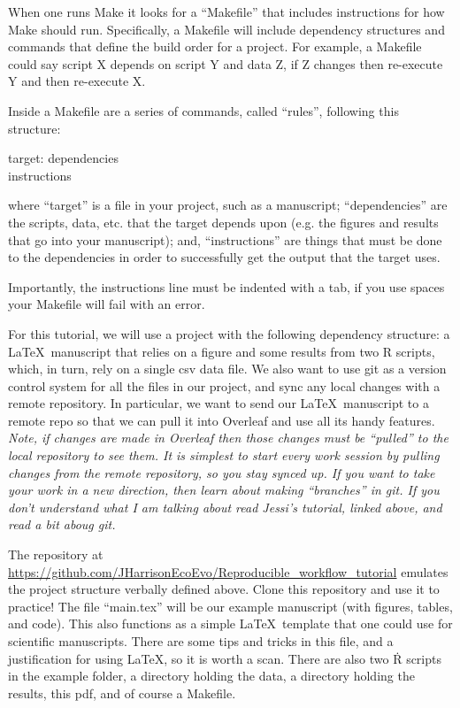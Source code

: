 \documentclass{article}
\begin{document}
When one runs {\sf Make} it looks for a ``Makefile'' that includes instructions for how {\sf Make} should run. Specifically, a Makefile will include dependency structures and commands that define the build order for a project. For example, a Makefile could say script X depends on script Y and data Z, if Z changes then re-execute Y and then re-execute X. 

Inside a Makefile are a series of commands, called ``rules'', following this structure: 

\begin{center}
target: dependencies\\
\indent instructions
\end{center}

\noindent where ``target'' is a file in your project, such as a manuscript; ``dependencies'' are the scripts, data, etc. that the target depends upon (e.g. the figures and results that go into your manuscript); and, ``instructions'' are things that must be done to the dependencies in order to successfully get the output that the target uses. 

Importantly, the instructions line must be indented with a tab, if you use spaces your Makefile will fail with an error.

For this tutorial, we will use a project with the following dependency structure: a \LaTeX\ manuscript that relies on a figure and some results from two {\sf R} scripts, which, in turn, rely on a single csv data file. We also want to use {\sf git} as a version control system for all the files in our project, and sync any local changes with a remote repository. In particular, we want to send our \LaTeX\ manuscript to a remote repo so that we can pull it into {\sf Overleaf} and use all its handy features. \emph{Note, if changes are made in Overleaf then those changes must be ``pulled'' to the local repository to see them. It is simplest to start every work session by pulling changes from the remote repository, so you stay synced up. If you want to take your work in a new direction, then learn about making ``branches'' in {\sf git}. If you don't understand what I am talking about read Jessi's tutorial, linked above, and read a bit aboug {\sf git}.}   

The repository at \url{https://github.com/JHarrisonEcoEvo/Reproducible_workflow_tutorial} emulates the project structure verbally defined above. Clone this repository and use it to practice! The file ``main.tex'' will be our example manuscript (with figures, tables, and code). This also functions as a simple \LaTeX\ template that one could use for scientific manuscripts. There are some tips and tricks in this file, and a justification for using \LaTeX, so it is worth a scan. There are also two \.R scripts in the example folder, a directory holding the data, a directory holding the results, this pdf, and of course a Makefile. 
\end{document}
